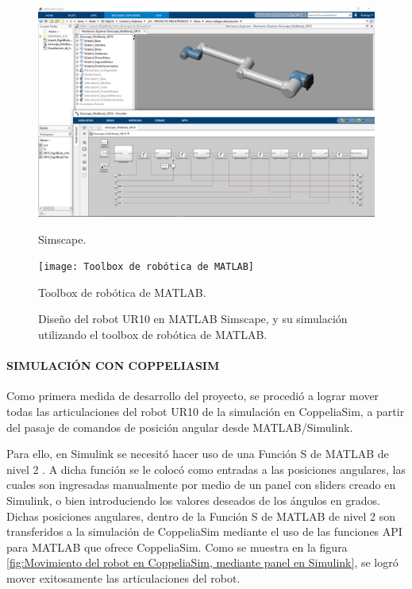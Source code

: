 \documentclass{article}
\begin{document}
\begin{sloppypar}
\begin{figure}[H]
    \centering
    \begin{minipage}{.5\textwidth}
        \centering
        \includegraphics[width=1\textwidth]{Simscape}
        \caption{Simscape.}
        \label{fig:Simscape}
    \end{minipage}%
    \begin{minipage}{.5\textwidth}
        \centering
        \texttt{[image: Toolbox de robótica de MATLAB]}
        \caption{Toolbox de robótica de MATLAB.}
        \label{fig:Toolbox de robótica de MATLAB}
    \end{minipage}
    \caption{Diseño del robot UR10 en MATLAB Simscape, y su simulación utilizando el toolbox de robótica de MATLAB.}
\end{figure}


\paragraph{SIMULACIÓN CON COPPELIASIM}
\label{sec:SIMULACIÓN CON COPPELIASIM}
\hfill

Como primera medida de desarrollo del proyecto, se procedió a lograr mover todas las articulaciones del robot UR10 de la simulación en CoppeliaSim, a partir del pasaje de comandos de posición angular desde MATLAB/Simulink.

Para ello, en Simulink se necesitó hacer uso de una Función S de MATLAB de nivel 2 \cite{Level-2_MATLAB_S-Functions}. A dicha función se le colocó como entradas a las posiciones angulares, las cuales son ingresadas manualmente por medio de un panel con sliders creado en Simulink, o bien introduciendo los valores deseados de los ángulos en grados. Dichas posiciones angulares, dentro de la Función S de MATLAB de nivel 2 son transferidos a la simulación de CoppeliaSim mediante el uso de las funciones API para MATLAB que ofrece CoppeliaSim. Como se muestra en la figura \ref{fig:Movimiento del robot en CoppeliaSim, mediante panel en Simulink}, se logró mover exitosamente las articulaciones del robot.



\end{sloppypar}
\end{document}

